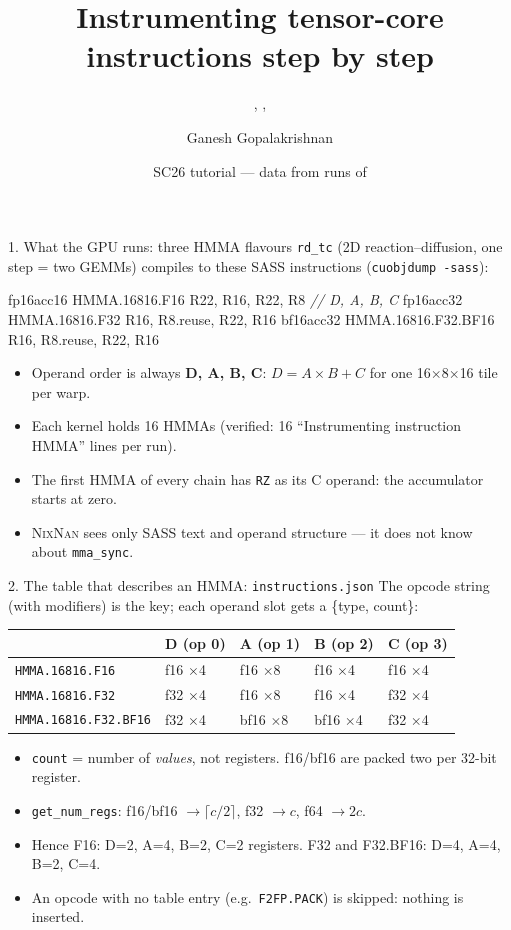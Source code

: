\documentclass[aspectratio=169,10pt]{beamer}
\title{Instrumenting tensor-core instructions step by step}
\subtitle{\tx{HMMA.16816.F16}, \tx{HMMA.16816.F32}, \tx{HMMA.16816.F32.BF16}}
\author{Ganesh Gopalakrishnan}
\date{SC26 tutorial --- data from \tx{TOOL\_VERBOSE=1} runs of \tx{rd\_tc}}
\newcommand{\nn}{\textsc{NixNan}}
\newcommand{\tx}[1]{\texttt{\small #1}}
\begin{document}
\maketitle

\begin{frame}[fragile]{1. What the GPU runs: three HMMA flavours}
\footnotesize
\tx{rd\_tc} (2D reaction--diffusion, one step = two GEMMs) compiles to these SASS instructions (\tx{cuobjdump -sass}):
\begin{semiverbatim}\scriptsize
fp16acc16  HMMA.16816.F16      R22, R16, R22, R8      \textit{// D, A, B, C}
fp16acc32  HMMA.16816.F32      R16, R8.reuse, R22, R16
bf16acc32  HMMA.16816.F32.BF16 R16, R8.reuse, R22, R16
\end{semiverbatim}
\begin{itemize}
\item Operand order is always \textbf{D, A, B, C}: $D = A\times B + C$ for one 16$\times$8$\times$16 tile per warp.
\item Each kernel holds 16 HMMAs (verified: 16 ``Instrumenting instruction HMMA'' lines per run).
\item The first HMMA of every chain has \tx{RZ} as its C operand: the accumulator starts at zero.
\item \nn{} sees only SASS text and operand structure --- it does not know about \tx{mma\_sync}.
\end{itemize}
\end{frame}

\begin{frame}[fragile]{2. The table that describes an HMMA: \tx{instructions.json}}
\footnotesize
The opcode string (with modifiers) is the key; each operand slot gets a \{type, count\}:
\medskip
\centering
\begin{tabular}{@{}l l l l l@{}}
\toprule
 & D (op 0) & A (op 1) & B (op 2) & C (op 3)\\
\midrule
\tx{HMMA.16816.F16} & f16 $\times$4 & f16 $\times$8 & f16 $\times$4 & f16 $\times$4\\
\tx{HMMA.16816.F32} & f32 $\times$4 & f16 $\times$8 & f16 $\times$4 & f32 $\times$4\\
\tx{HMMA.16816.F32.BF16} & f32 $\times$4 & bf16 $\times$8 & bf16 $\times$4 & f32 $\times$4\\
\bottomrule
\end{tabular}
\medskip

\raggedright
\begin{itemize}
\item \texttt{count} = number of \emph{values}, not registers. f16/bf16 are packed two per 32-bit register.
\item \tx{get\_num\_regs}: f16/bf16 $\to\lceil c/2\rceil$, f32 $\to c$, f64 $\to 2c$.
\item Hence F16: D=2, A=4, B=2, C=2 registers. F32 and F32.BF16: D=4, A=4, B=2, C=4.
\item An opcode with no table entry (e.g.\ \tx{F2FP.PACK}) is skipped: nothing is inserted.
\end{itemize}
\end{frame}
\end{document}
